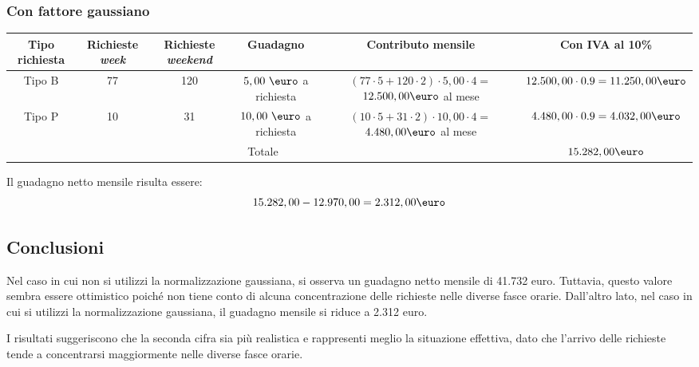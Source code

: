\documentclass[a4paper, 12pt]{article}
\begin{document}
\subsubsection{Con fattore gaussiano}
\begin{adjustbox}{width=\textwidth}
\begin{tabular}{|c|c|c|c|c|c|}
\hline
\cellcolor{cellcolor}Tipo richiesta & \cellcolor{cellcolor}Richieste \textit{week} & \cellcolor{cellcolor}Richieste \textit{weekend} & \cellcolor{cellcolor}Guadagno & \cellcolor{cellcolor}Contributo mensile &
\cellcolor{cellcolor} Con IVA al 10\% \\
\hline
\hline
Tipo B & 77 & 120 & $5,00\ \mbox{\euro}$ a richiesta & \makecell{$ (77 \cdot 5 + 120 \cdot 2 )\cdot 5,00 \cdot 4 =$ \\ $12.500,00 \mbox{\euro}$ al mese } & $ 12.500,00 \cdot 0.9 = 11.250,00 \mbox{\euro}$ \\
\hline
Tipo P & 10 & 31 & $10,00\ \mbox{\euro}$ a richiesta & \makecell{$ (10 \cdot 5 + 31 \cdot 2 )\cdot 10,00 \cdot 4 =$ \\ $4.480,00 \mbox{\euro}$ al mese } & $ 4.480,00 \cdot 0.9 = 4.032,00 \mbox{\euro}$ \\

\hline
\hline

\multicolumn{5}{|c|}{Totale} & \cellcolor{green!40} $15.282,00 \mbox{\euro}$\\
\hline

\end{tabular}
\end{adjustbox}
\bigskip

Il guadagno netto mensile risulta essere:
\[
	15.282,00 - 12.970,00 = 2.312,00 \mbox{\euro}
\]



\subsection{Conclusioni}
Nel caso in cui non si utilizzi la normalizzazione gaussiana, si osserva un guadagno netto mensile di 41.732 euro. Tuttavia, questo valore sembra essere ottimistico poiché non tiene conto di alcuna concentrazione delle richieste nelle diverse fasce orarie. Dall'altro lato, nel caso in cui si utilizzi la normalizzazione gaussiana, il guadagno mensile si riduce a 2.312 euro.

I risultati suggeriscono che la seconda cifra sia più realistica e rappresenti meglio la situazione effettiva, dato che l'arrivo delle richieste tende a concentrarsi maggiormente nelle diverse fasce orarie.
\end{document}
